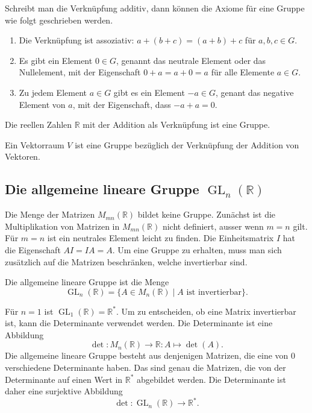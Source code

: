 Schreibt man die Verknüpfung additiv, dann können die Axiome für
eine Gruppe wie folgt geschrieben werden.
\begin{enumerate}
\item Die Verknüpfung ist assoziativ:
$a+(b+c)=(a+b)+c$ für $a,b,c\in G$.
\item Es gibt ein Element $0\in G$, genannt das neutrale Element oder
das Nullelement, mit der Eigenschaft $0+a=a+0=a$ für alle Elemente $a\in G$.
\item Zu jedem Element $a\in G$ gibt es ein Element $-a\in G$, genant
das negative Element von $a$, mit der Eigenschaft, dass $-a + a=0$.
\end{enumerate}

\begin{beispiel}
Die reellen Zahlen $\mathbb R$ mit der Addition als Verknüpfung ist eine
Gruppe.
\end{beispiel}

\begin{beispiel}
Ein Vektorraum $V$ ist eine Gruppe bezüglich der Verknüpfung der Addition
von Vektoren.
\end{beispiel}

%
%
\subsection{Die allgemeine lineare Gruppe $\operatorname{GL}_n(\mathbb R)$}
Die Menge der Matrizen $M_{mn}(\mathbb R)$ bildet keine Gruppe.
Zunächst ist die Multiplikation von Matrizen in $M_{mn}(\mathbb R)$
nicht definiert, ausser wenn $m=n$ gilt.
Für $m=n$ ist ein neutrales Element leicht zu finden.
Die Einheitsmatrix $I$ hat die Eigenschaft $AI=IA=A$.
Um eine Gruppe zu erhalten, muss man sich zusätzlich auf die 
Matrizen beschränken, welche invertierbar sind.

\begin{definition}
Die allgemeine lineare Gruppe ist die Menge
\[
\operatorname{GL}_n(\mathbb R)
=
\{ A\in M_n(\mathbb R)\;|\; \text{$A$ ist invertierbar}\}.
\]
\end{definition}

Für $n=1$ ist $\operatorname{GL}_1(\mathbb R) = \mathbb R^*$.
Um zu entscheiden, ob eine Matrix invertierbar ist, kann die Determinante
verwendet werden.
Die Determinante ist eine Abbildung
\[
\det
\colon
M_n(\mathbb R) \to \mathbb R
:
A \mapsto \det(A).
\]
Die allgemeine lineare Gruppe besteht aus denjenigen Matrizen,
die eine von $0$ verschiedene Determinante haben.
Das sind genau die Matrizen, die von der Determinante
auf einen Wert in $\mathbb R^*$ abgebildet werden.
Die Determinante ist daher eine surjektive Abbildung
\[
\det
\colon
\operatorname{GL}_n(\mathbb R)
\to
\mathbb R^*.
\]


